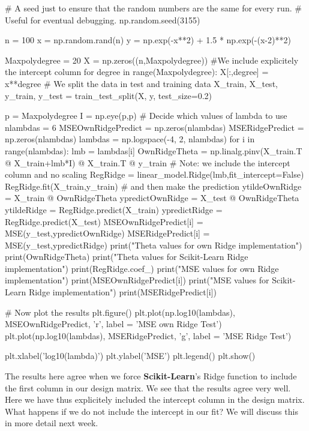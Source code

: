 \documentclass[%
oneside,                 %
final,                   %
10pt]{article}
\begin{document}
# A seed just to ensure that the random numbers are the same for every run.
# Useful for eventual debugging.
np.random.seed(3155)

n = 100
x = np.random.rand(n)
y = np.exp(-x**2) + 1.5 * np.exp(-(x-2)**2)

Maxpolydegree = 20
X = np.zeros((n,Maxpolydegree))
#We include explicitely the intercept column
for degree in range(Maxpolydegree):
    X[:,degree] = x**degree
# We split the data in test and training data
X_train, X_test, y_train, y_test = train_test_split(X, y, test_size=0.2)

p = Maxpolydegree
I = np.eye(p,p)
# Decide which values of lambda to use
nlambdas = 6
MSEOwnRidgePredict = np.zeros(nlambdas)
MSERidgePredict = np.zeros(nlambdas)
lambdas = np.logspace(-4, 2, nlambdas)
for i in range(nlambdas):
    lmb = lambdas[i]
    OwnRidgeTheta = np.linalg.pinv(X_train.T @ X_train+lmb*I) @ X_train.T @ y_train
    # Note: we include the intercept column and no scaling
    RegRidge = linear_model.Ridge(lmb,fit_intercept=False)
    RegRidge.fit(X_train,y_train)
    # and then make the prediction
    ytildeOwnRidge = X_train @ OwnRidgeTheta
    ypredictOwnRidge = X_test @ OwnRidgeTheta
    ytildeRidge = RegRidge.predict(X_train)
    ypredictRidge = RegRidge.predict(X_test)
    MSEOwnRidgePredict[i] = MSE(y_test,ypredictOwnRidge)
    MSERidgePredict[i] = MSE(y_test,ypredictRidge)
    print("Theta values for own Ridge implementation")
    print(OwnRidgeTheta)
    print("Theta values for Scikit-Learn Ridge implementation")
    print(RegRidge.coef_)
    print("MSE values for own Ridge implementation")
    print(MSEOwnRidgePredict[i])
    print("MSE values for Scikit-Learn Ridge implementation")
    print(MSERidgePredict[i])

# Now plot the results
plt.figure()
plt.plot(np.log10(lambdas), MSEOwnRidgePredict, 'r', label = 'MSE own Ridge Test')
plt.plot(np.log10(lambdas), MSERidgePredict, 'g', label = 'MSE Ridge Test')

plt.xlabel('log10(lambda)')
plt.ylabel('MSE')
plt.legend()
plt.show()


\epycod


The results here agree when we force \textbf{Scikit-Learn}'s Ridge function to include the first column in our design matrix.
We see that the results agree very well. Here we have thus explicitely included the intercept column in the design matrix.
What happens if we do not include the intercept in our fit? We will discuss this in more detail next week.

\end{document}
